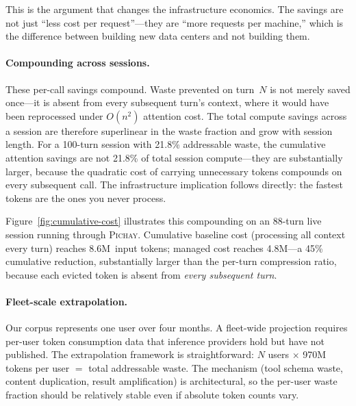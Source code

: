 This is the argument that changes the infrastructure economics.
The savings are not just ``less cost per request''---they are
``more requests per machine,'' which is the difference between
building new data centers and not building them.

\paragraph{Compounding across sessions.}
These per-call savings compound. Waste prevented on turn~$N$ is not
merely saved once---it is absent from every subsequent turn's
context, where it would have been reprocessed under $O(n^2)$
attention cost. The total compute savings across a session are
therefore superlinear in the waste fraction and grow with session
length. For a 100-turn session with 21.8\% addressable waste, the
cumulative attention savings are not 21.8\% of total session
compute---they are substantially larger, because the quadratic cost
of carrying unnecessary tokens compounds on every subsequent call.
The infrastructure implication follows directly: the fastest tokens
are the ones you never process.

Figure~\ref{fig:cumulative-cost} illustrates this compounding on an
88-turn live session running through \textsc{Pichay}. Cumulative
baseline cost (processing all context every turn) reaches 8.6M~input
tokens; managed cost reaches 4.8M---a 45\% cumulative reduction,
substantially larger than the per-turn compression ratio, because
each evicted token is absent from \emph{every subsequent turn}.



\paragraph{Fleet-scale extrapolation.}
Our corpus represents one user over four months. A fleet-wide
projection requires per-user token consumption data that inference
providers hold but have not published. The extrapolation framework
is straightforward: $N$ users $\times$ 970M tokens per user $=$
total addressable waste. The mechanism (tool schema waste, content
duplication, result amplification) is architectural, so the
per-user waste fraction should be relatively stable even if
absolute token counts vary.

